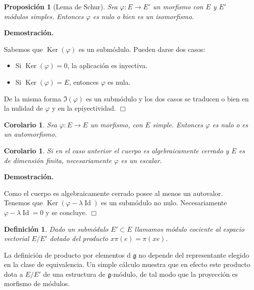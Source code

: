 \documentclass[a4paper,draft,12pt]{article}
\newtheorem{defi}{Definición}[section]%
\newtheorem{propo}[teo]{Proposición}%
\newtheorem{cor}[teo]{Corolario}%
\newcommand{\dem}{\noindent \textbf{Demostración. }\vspace{0.3 cm}}%
\newcommand{\g}{\mathfrak{g}}%
\newcommand{\fin}{ $\Box $ \vspace{0.4 cm}}
\DeclareMathOperator{\Ker}{Ker}%
\DeclareMathOperator{\Id}{Id}%
\begin{document}
\begin{propo}[Lema de Schur] 

Sea $\varphi: E \rightarrow E'$ un morfismo con $E$ y $E'$ módulos simples.  Entonces $\varphi$ es nulo o bien es un isomorfismo.

\end{propo}

\dem

Sabemos que $\Ker(\varphi)$ es un submódulo.  Pueden darse dos casos:

\begin{itemize}

\item Si $\Ker(\varphi)=0$, la aplicación es inyectiva.

\item Si $\Ker(\varphi)=E$, entonces $\varphi$ es nula.

\end{itemize}

De la misma forma $\Im(\varphi)$ es un submódulo y los dos casos se traducen o bien en la nulidad de $\varphi$ y en la epiyectividad. \fin

\begin{cor}

Sea $\varphi: E \rightarrow E$ un morfismo, con $E$ simple.  Entonces $\varphi$ es nulo o es un automorfismo.

\end{cor}

\begin{cor}

Si en el caso anterior el cuerpo es algebraicamente cerrado y $E$ es de dimensión finita, necesariamente $\varphi$ es un escalar.

\end{cor}

\dem

Como el cuerpo es algebraicamente cerrado posee al menos un autovalor.  Tenemos que $\Ker(\varphi-\lambda \Id)$ es un submódulo no nulo.  Necesariamente $\varphi- \lambda \Id=0$ y se concluye. \fin

\begin{defi}

Dado  un submódulo $E' \subset E$ llamamos {módulo cociente} al espacio vectorial $E/E'$ dotado del producto $x \pi(e)= \pi(xe)$.

\end{defi}

La definición de producto por elementos d $\g$ no depende del representante elegido en la clase de equivalencia.  Un simple cálculo muestra que en efecto este producto dota a $E/E'$ de una estructura de $\g$-módulo, de tal modo que la proyección es morfismo de módulos.
\end{document}
